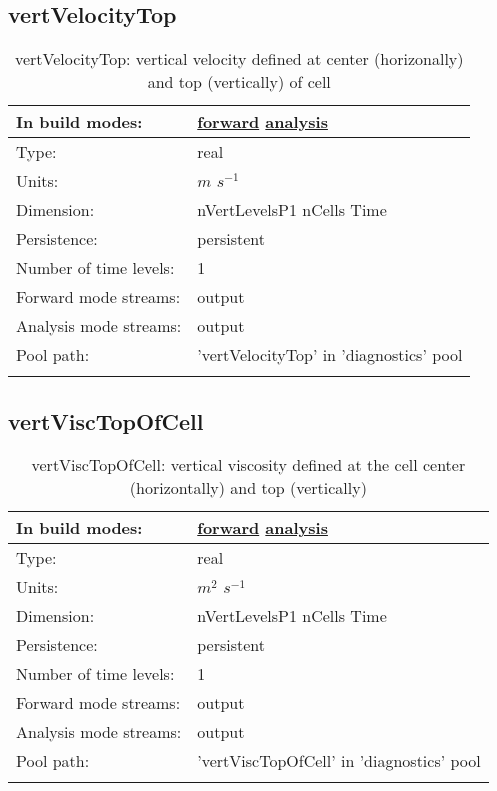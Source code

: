 \subsection[vertVelocityTop]{vertVelocityTop}
\label{subsec:var_sec_diagnostics_vertVelocityTop}
\begin{center}
\begin{longtable}{| p{2.0in} | p{4.0in} |}
        \hline 
        In build modes: & \hyperref[subsec:forward_var_tab_diagnostics]{forward} \hyperref[subsec:analysis_var_tab_diagnostics]{analysis} \\
        \hline 
        Type: & real \\
        \hline 
        Units: & $m$ $s^{-1}$ \\
        \hline 
        Dimension: & nVertLevelsP1 nCells Time \\
        \hline 
        Persistence: & persistent \\
        \hline 
        Number of time levels: & 1 \\
        \hline 
		 Forward mode streams: &  output \\
        \hline 
		 Analysis mode streams: &  output \\
        \hline 
            Pool path: & 'vertVelocityTop' in 'diagnostics' pool
 \\
		 \hline 
    \caption{vertVelocityTop: vertical velocity defined at center (horizonally) and top (vertically) of cell}
\end{longtable}
\end{center}
\subsection[vertViscTopOfCell]{vertViscTopOfCell}
\label{subsec:var_sec_diagnostics_vertViscTopOfCell}
\begin{center}
\begin{longtable}{| p{2.0in} | p{4.0in} |}
        \hline 
        In build modes: & \hyperref[subsec:forward_var_tab_diagnostics]{forward} \hyperref[subsec:analysis_var_tab_diagnostics]{analysis} \\
        \hline 
        Type: & real \\
        \hline 
        Units: & $m^2$ $s^{-1}$ \\
        \hline 
        Dimension: & nVertLevelsP1 nCells Time \\
        \hline 
        Persistence: & persistent \\
        \hline 
        Number of time levels: & 1 \\
        \hline 
		 Forward mode streams: &  output \\
        \hline 
		 Analysis mode streams: &  output \\
        \hline 
            Pool path: & 'vertViscTopOfCell' in 'diagnostics' pool
 \\
		 \hline 
    \caption{vertViscTopOfCell: vertical viscosity defined at the cell center (horizontally) and top (vertically)}
\end{longtable}
\end{center}
